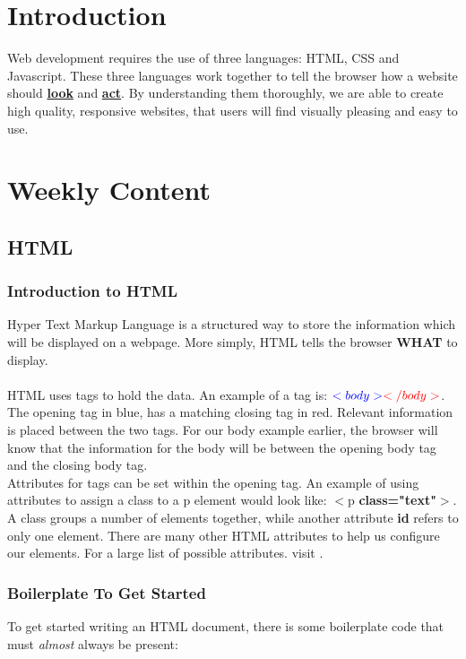 \documentclass[portfolio.tex]{subfiles}
\begin{document}
		\section{Introduction}
			Web development requires the use of three languages: HTML, CSS and Javascript. These three languages work together to tell the browser how a website should \underline{\textbf{look}} and \underline{\textbf{act}}. By understanding them thoroughly, we are able to create high quality, responsive websites, that users will find visually pleasing and easy to use.\\
		\section{Weekly Content}
			\subsection{HTML}
				\subsubsection{Introduction to HTML}

					Hyper Text Markup Language is a structured way to store the information which will be displayed on a webpage. More simply, HTML tells the browser \textbf{WHAT} to display.\\
					\\
					 HTML uses tags to hold the data. An example of a tag is: $\color{blue}<body>\color{red}</body>$. The opening tag in blue, has a matching closing tag in red.  Relevant information is placed between the two tags. For our body example earlier, the browser will know that the information for the body will be between the opening body tag and the closing body tag.\\

					 Attributes for tags can be set within the opening tag. An example of using attributes to assign a class to a p element would look like: $<$p \textbf{class="text"}$>$.  A class groups a number of elements together, while another attribute \textbf{id} refers to only one element. There are many other HTML attributes to help us configure our elements. For a large list of possible attributes. visit .\\



				\subsubsection{Boilerplate To Get Started}
				\label{html-boiler}
				To get started writing an HTML document, there is some boilerplate code that must \textit{almost} always be present:\\
\end{document}
